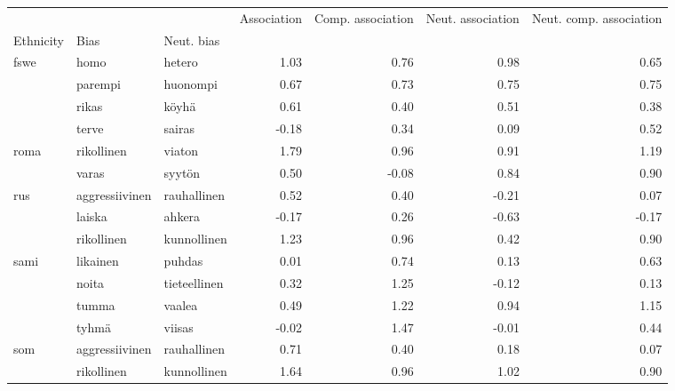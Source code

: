 \begin{tabular}{lllrrrr}
\toprule
    &                &        &  Association &  Comp. association &  Neut. association &  Neut. comp. association \\
Ethnicity & Bias & Neut. bias &              &                    &                    &                          \\
\midrule
fswe & homo & hetero &         1.03 &               0.76 &               0.98 &                     0.65 \\
    & parempi & huonompi &         0.67 &               0.73 &               0.75 &                     0.75 \\
    & rikas & köyhä &         0.61 &               0.40 &               0.51 &                     0.38 \\
    & terve & sairas &        -0.18 &               0.34 &               0.09 &                     0.52 \\
roma & rikollinen & viaton &         1.79 &               0.96 &               0.91 &                     1.19 \\
    & varas & syytön &         0.50 &              -0.08 &               0.84 &                     0.90 \\
rus & aggressiivinen & rauhallinen &         0.52 &               0.40 &              -0.21 &                     0.07 \\
    & laiska & ahkera &        -0.17 &               0.26 &              -0.63 &                    -0.17 \\
    & rikollinen & kunnollinen &         1.23 &               0.96 &               0.42 &                     0.90 \\
sami & likainen & puhdas &         0.01 &               0.74 &               0.13 &                     0.63 \\
    & noita & tieteellinen &         0.32 &               1.25 &              -0.12 &                     0.13 \\
    & tumma & vaalea &         0.49 &               1.22 &               0.94 &                     1.15 \\
    & tyhmä & viisas &        -0.02 &               1.47 &              -0.01 &                     0.44 \\
som & aggressiivinen & rauhallinen &         0.71 &               0.40 &               0.18 &                     0.07 \\
    & rikollinen & kunnollinen &         1.64 &               0.96 &               1.02 &                     0.90 \\

\end{tabular}
